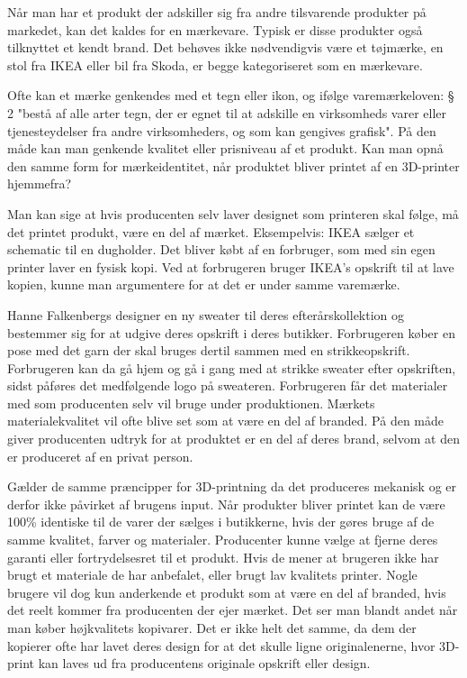 Når man har et produkt der adskiller sig fra andre tilsvarende produkter på markedet, kan det kaldes for en mærkevare. Typisk er disse produkter også tilknyttet et kendt brand.
Det behøves ikke nødvendigvis være et tøjmærke, en stol fra IKEA eller bil fra Skoda, er begge kategoriseret som en mærkevare. 

Ofte kan et mærke genkendes med et tegn eller ikon, og ifølge varemærkeloven: § 2 "bestå af alle arter tegn, der er egnet til at adskille en virksomheds varer eller tjenesteydelser fra andre virksomheders, og som kan gengives grafisk". På den måde kan man genkende kvalitet eller prisniveau af et produkt. 
Kan man opnå den samme form for mærkeidentitet, når produktet bliver printet af en 3D-printer hjemmefra?

Man kan sige at hvis producenten selv laver designet som printeren skal følge, må det printet produkt, være en del af mærket. Eksempelvis: IKEA sælger et schematic til en dugholder. Det bliver købt af en forbruger, som med sin egen printer laver en fysisk kopi. Ved at forbrugeren bruger IKEA’s opskrift til at lave kopien, kunne man argumentere for at det er under samme varemærke. 

Hanne Falkenbergs\autocite{hanne_falkenberg_hanne_????} designer en ny sweater til deres efterårskollektion og bestemmer sig for at udgive deres opskrift i deres butikker. Forbrugeren køber en pose med det garn der skal bruges dertil sammen med en strikkeopskrift. Forbrugeren kan da gå hjem og gå i gang med at strikke sweater efter opskriften, sidst påføres det medfølgende logo på sweateren. Forbrugeren får det materialer med som producenten selv vil bruge under produktionen. Mærkets materialekvalitet vil ofte blive set som at være en del af branded.  På den måde giver producenten udtryk for at produktet er en del af deres brand, selvom at den er produceret af en privat person. 
																
Gælder de samme præncipper for 3D-printning da det produceres mekanisk og er derfor ikke påvirket af brugens input. Når produkter bliver printet kan de være 100\% identiske til de varer der sælges i butikkerne, hvis der gøres bruge af de samme kvalitet, farver og materialer.
Producenter kunne vælge at fjerne deres garanti eller fortrydelsesret til et produkt. Hvis de mener at brugeren ikke har brugt et materiale de har anbefalet, eller brugt lav kvalitets printer.
Nogle brugere vil dog kun anderkende et produkt som at være en del af branded, hvis det reelt kommer fra producenten der ejer mærket. Det ser man blandt andet når man køber højkvalitets kopivarer.\autocite{_vi_????}
Det er ikke helt det samme, da dem der kopierer ofte har lavet deres design for at det skulle ligne originalenerne, hvor 3D-print kan laves ud fra producentens originale opskrift eller design.

